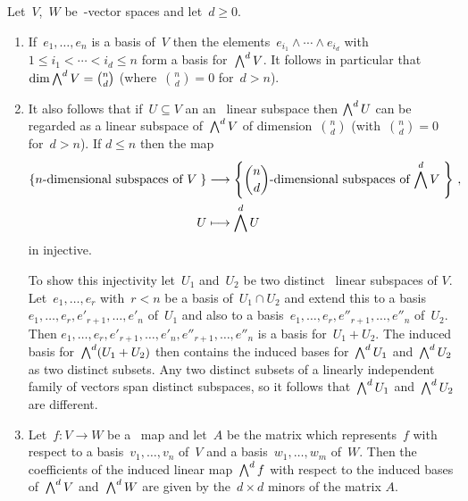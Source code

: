 \begin{recall}
  Let~$V$,~$W$ be~-vector spaces and let~$d \geq 0$.
  \begin{enumerate}
    \item
      If~$e_1, \dotsc, e_n$ is a basis of~$V$ then the elements~$e_{i_1} \wedge \dotsb \wedge e_{i_d}$ with~$1 \leq i_1 < \dotsb < i_d \leq n$ form a basis for~$\bigwedge^d V$.
      It follows in particular that~$\dim \bigwedge^d V = \binom{n}{d}$ (where~$\binom{n}{d} = 0$ for~$d > n$).
    \item
      It also follows that if~$U \subseteq V$ an an~ linear subspace then $\bigwedge^d U$ can be regarded as a linear subspace of~$\bigwedge^d V$ of dimension~$\binom{n}{d}$ (with~$\binom{n}{d} = 0$ for~$d > n$).
      If $d \leq n$ then the map
      \begin{align*}
                      \left\{
                        \text{\dash{$n$}{dimensional} subspaces of $V$} \;
                      \right\}
        &\longto      \left\{
                        \text{\dash{$\binom{n}{d}$}{dimensional} subspaces of $\exterior^d V$} \;
                      \right\} \,,
        \\
                      U
        &\longmapsto  \exterior^d U
      \end{align*}
      in injective.
      
      To show this injectivity let~$U_1$ and~$U_2$ be two distinct~ linear subspaces of $V$.
      Let~$e_1, \dotsc, e_r$ with~$r < n$ be a basis of~$U_1 \cap U_2$ and extend this to a basis~$e_1, \dotsc, e_r, e'_{r+1}, \dotsc, e'_n$ of~$U_1$ and also to a basis~$e_1, \dotsc, e_r, e''_{r+1}, \dotsc, e''_n$ of~$U_2$.
      Then $e_1, \dotsc, e_r, e'_{r+1}, \dotsc, e'_n, e''_{r+1}, \dotsc, e''_n$ is a basis for~$U_1 + U_2$.
      The induced basis for~$\bigwedge^d(U_1 + U_2)$ then contains the induced bases for~$\bigwedge^d U_1$ and~$\bigwedge^d U_2$ as two distinct subsets.
      Any two distinct subsets of a linearly independent family of vectors span distinct subspaces, so it follows that~$\bigwedge^d U_1$ and~$\bigwedge^d U_2$ are different.
    \item
      Let~$f \colon V \to W$ be a~ map and let~$A$ be the matrix which represents~$f$ with respect to a basis~$v_1, \dotsc, v_n$ of~$V$ and a basis~$w_1, \dotsc, w_m$ of~$W$.
      Then the coefficients of the induced linear map~$\bigwedge^d f$ with respect to the induced bases of~$\bigwedge^d V$ and~$\bigwedge^d W$ are given by the~$d \times d$ minors of the matrix $A$.
      

\end{enumerate}
\end{recall}
